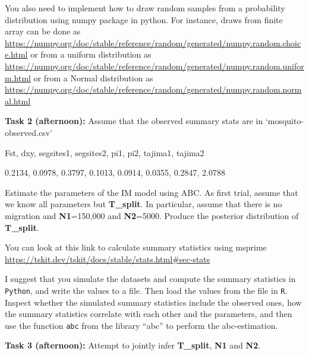 \documentclass[11pt]{article}
\begin{document}
You also need to implement how to draw random samples from a probability distribution using numpy package in python. For instance, draws from finite array can be done as\\
\url{https://numpy.org/doc/stable/reference/random/generated/numpy.random.choice.html} or from a uniform distribution as\\
\url{https://numpy.org/doc/stable/reference/random/generated/numpy.random.uniform.html} or from a Normal distribution as\\
\url{https://numpy.org/doc/stable/reference/random/generated/numpy.random.normal.html}

\textbf{Task 2 (afternoon):} Assume that the observed summary stats are in `mosquito-observed.csv'

Fst, dxy, segsites1, segsites2, pi1, pi2, tajima1, tajima2

0.2134, 0.0978, 0.3797, 0.1013, 0.0914, 0.0355, 0.2847, 2.0788

Estimate the parameters of the IM model using ABC. As first trial, assume that we know all parameters but \textbf{T\_split}. In particular, assume that there is no migration and \textbf{N1}=150,000 and \textbf{N2}=5000. Produce the posterior distribution of \textbf{T\_split}.

You can look at this link to calculate summary statistics using msprime\\
\url{https://tskit.dev/tskit/docs/stable/stats.html#sec-stats}

I suggest that you simulate the datasets and compute the summary statistics in \texttt{Python}, and write the values to a file. Then load the values from the file in \texttt{R}. Inspect whether the simulated summary statistics include the observed ones, how the summary statistics correlate with each other and the parameters, and then use the function \texttt{abc} from the library ``abc'' to perform the abc-estimation.

\textbf{Task 3 (afternoon):} Attempt to jointly infer \textbf{T\_split}, \textbf{N1} and \textbf{N2}.
\end{document}
